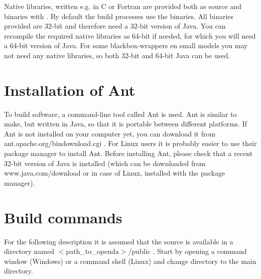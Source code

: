 Native libraries, written e.g. in C or Fortran are provided both as source and binaries with \oda. By default the build processes use the binaries. All binaries provided are 32-bit and therefore need a 32-bit version of Java. You can recompile the required native libraries as 64-bit if needed, for which you will need a 64-bit version of Java. For some blackbox-wrappers en small models you may not need any native libraries, so both 32-bit and 64-bit Java can be used.

\section{Installation of Ant}
To build \oda software, a command-line tool called Ant is used. Ant is similar to make, but written in Java, so that it is portable between different platforms. If Ant is not installed on your computer yet, you can download it from ant.apache.org/bindownload.cgi . For Linux users it is probably easier to use their package manager to install Ant. Before installing Ant, please check that a recent 32-bit version of Java is installed (which can be downloaded from www.java.com/download or in case of Linux, installed with the package manager).

\section{Build commands}
For the following description it is assumed that the \oda source is available in a directory named $<$path\_to\_openda$>$/public .
Start by opening a command window (Windows) or a command shell (Linux) and change directory to the \oda main directory.


